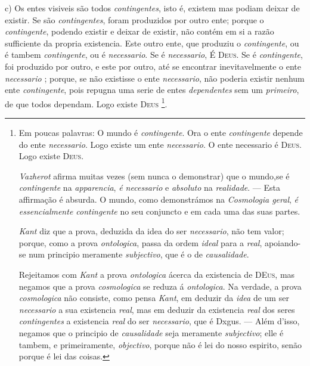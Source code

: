 c) Os entes visiveis são todos \emph{contingentes}, isto é, existem mas podiam deixar de existir. Se são \emph{contingentes}, foram produzidos por outro ente; porque o \emph{contingente}, podendo existir e deixar de existir, não contém em si a razão sufficiente da propria existencia. Este outro ente, que produziu o \emph{contingente}, ou é tambem \emph{contingente}, ou é \emph{necessario}. Se é \emph{necessario}, É \textsc{Deus}. Se é \emph{contingente}, foi produzido por outro, e este por outro, até se encontrar inevitavelmente o ente \emph{necessario} ; porque, se não existisse o ente \emph{necessario}, não poderia existir nenhum ente \emph{contingente}, pois repugna uma serie de entes \emph{dependentes} sem um \emph{primeiro}, de que todos dependam. Logo existe \textsc{Deus} \footnote{Em poucas palavras: O mundo é \emph{contingente}. Ora o ente \emph{contingente} depende do ente \emph{necessario}. Logo existe um ente \emph{necessario}. O ente necessario é \textsc{Deus}. Logo existe \textsc{Deus}.\par \emph{Vazherot} afirma muitas vezes (sem nunca o demonstrar) que o mundo,se é \emph{contingente} na \emph{apparencia}, \emph{é necessario} e \emph{absoluto} na \emph{realidade}. --- Esta affirmação é absurda. O mundo, como demonstrámos na \emph{Cosmologia geral}, \emph{é essencialmente contingente} no seu conjuncto e em cada uma das suas partes.\par \emph{Kant} diz que a prova, deduzida da idea do ser \emph{necessario}, não tem valor; porque, como a prova \emph{ontologica}, passa da ordem \emph{ideal} para a \emph{real}, apoiando-se num principio meramente \emph{subjectivo}, que é o de \emph{causalidade}.\par Rejeitamos com \emph{Kant} a prova \emph{ontologica} ácerca da existencia de \textsc{DEus}, mas negamos que a prova \emph{cosmologica} se reduza á \emph{ontologica}. Na verdade, a prova \emph{cosmologica} não consiste, como pensa \emph{Kant}, em deduzir da \emph{idea} de um ser \emph{necessario} a sua existencia \emph{real}, mas em deduzir da existencia \emph{real} dos seres \emph{contingentes} a existencia \emph{real} do ser \emph{necessario}, que é Dxgus. --- Além d'isso, negamos que o principio de \emph{causalidade} seja meramente \emph{subjectivo}; elle é tambem, e primeiramente, \emph{objectivo}, porque não é lei do nosso espirito, senão porque é lei das coisas.}.

